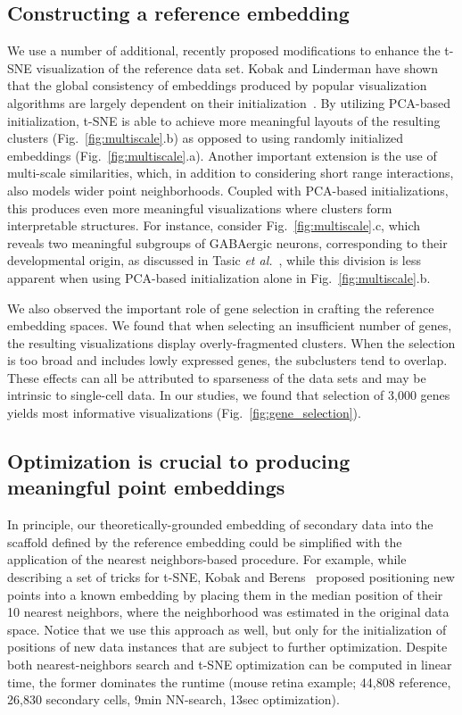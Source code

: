 \documentclass[runningheads]{llncs}
\newcommand{\etal}{\textit{et al.}}
\begin{document}
\subsection{Constructing a reference embedding}

We use a number of additional, recently proposed modifications to enhance the t-SNE visualization of the reference data set.
Kobak and Linderman have shown that the global consistency of embeddings produced by
popular visualization algorithms are largely dependent on their initialization~\cite{Kobak2019a}. By utilizing PCA-based initialization, t-SNE is able to achieve
more meaningful layouts of the resulting clusters (Fig.~\ref{fig:multiscale}.b)
as opposed to using randomly initialized embeddings (Fig.~\ref{fig:multiscale}.a).
Another important extension is the use of multi-scale similarities, which, in addition
to considering short range interactions, also models wider point neighborhoods. Coupled
with PCA-based initializations, this produces even more meaningful visualizations where
clusters form interpretable structures. For instance, consider Fig.~\ref{fig:multiscale}.c, which reveals two meaningful subgroups of GABAergic neurons, corresponding to their
developmental origin, as discussed in Tasic \etal~\cite{Tasic2018}, while this division
is less apparent when using PCA-based initialization alone in
Fig.~\ref{fig:multiscale}.b.

We also observed the important role of gene selection in crafting the reference
embedding spaces. We found that when selecting an insufficient number of genes,
the resulting visualizations display overly-fragmented clusters. When the
selection is too broad and includes lowly expressed genes, the subclusters tend
to overlap. These effects can all be attributed to sparseness of the data sets
and may be intrinsic to single-cell data. In our studies, we found that
selection of 3,000 genes yields most informative visualizations
(Fig.~\ref{fig:gene_selection}).

\subsection{Optimization is crucial to producing meaningful point embeddings}

In principle, our theoretically-grounded embedding of secondary data into the
scaffold defined by the reference embedding could be simplified with the
application of the nearest neighbors-based procedure. For example, while
describing a set of tricks for t-SNE, Kobak and Berens~\cite{Kobak2019}
proposed positioning new points into a known embedding by placing them in the
median position of their 10 nearest neighbors, where the neighborhood was
estimated in the original data space. Notice that we use this approach as well,
but only for the initialization of positions of new data instances that are
subject to further optimization. Despite both nearest-neighbors search and
t-SNE optimization can be computed in linear time, the former dominates the
runtime (mouse retina example; 44,808 reference, 26,830 secondary cells,
9min NN-search, 13sec optimization).
\end{document}

